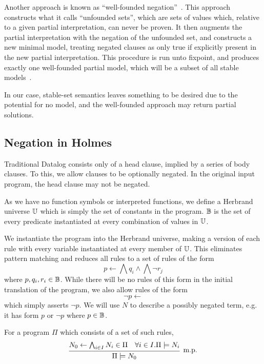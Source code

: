 Another approach is known as ``well-founded negation''~\cite{wellfounded}.
This approach constructs what it calls ``unfounded sets'', which are sets of values which, relative to a given partial interpretation, can never be proven.
It then augments the partial interpretation with the negation of the unfounded set, and constructs a new minimal model, treating negated clauses as only true if explicitly present in the new partial interpretation.
This procedure is run unto fixpoint, and produces exactly one well-founded partial model, which will be a subset of all stable models~\cite{wellfounded}.

In our case, stable-set semantics leaves something to be desired due to the potential for no model, and the well-founded approach may return partial solutions.
\subsection{Negation in Holmes}
Traditional Datalog consists only of a head clause, implied by a series of body clauses.
To this, we allow clauses to be optionally negated.
In the original input program, the head clause may not be negated.

As we have no function symbols or interpreted functions, we define a Herbrand universe $\mathbb{U}$ which is simply the set of constants in the program.
$\mathbb{B}$ is the set of every predicate instantiated at every combination of values in $\mathbb{U}$.

We instantiate the program into the Herbrand universe, making a version of each rule with every variable instantiated at every member of $\mathbb{U}$.
This eliminates pattern matching and reduces all rules to a set of rules of the form
\[
	p \leftarrow \bigwedge q_i \wedge \bigwedge \neg r_j
\]
where $p, q_i, r_i \in \mathbb{B}$.
While there will be no rules of this form in the initial translation of the program, we also allow rules of the form
\[
	\neg p \leftarrow
\]
which simply asserts $\neg p$.
We will use $N$ to describe a possibly negated term, e.g. it has form $p$ or $\neg p$ where $p \in \mathbb{B}$.

For a program $\Pi$ which consists of a set of such rules,
\[
	\infer[\textrm{m.p.}]{\Pi \models N_0}{N_0 \leftarrow \bigwedge_{i \in I} N_i \in \Pi & \forall i \in I. \Pi \models N_i}
\]

